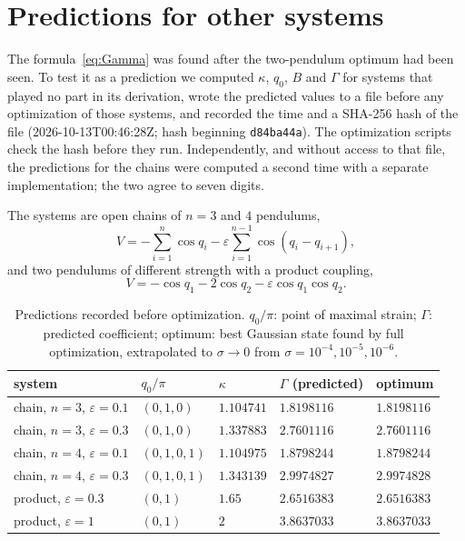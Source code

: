 \section{Predictions for other systems}
\label{sec:prediction}

The formula~\eqref{eq:Gamma} was found after the two-pendulum optimum had been seen. To test it as a prediction we computed $\kappa$, $q_0$, $B$ and $\Gamma$ for systems that played no part in its derivation, wrote the predicted values to a file before any optimization of those systems, and recorded the time and a SHA-256 hash of the file (2026-10-13T00:46:28Z; hash beginning \texttt{d84ba44a}). The optimization scripts check the hash before they run. Independently, and without access to that file, the predictions for the chains were computed a second time with a separate implementation; the two agree to seven digits.

The systems are open chains of $n = 3$ and $4$ pendulums,
\begin{equation}
V = -\sum_{i=1}^n \cos q_i - \varepsilon\sum_{i=1}^{n-1}\cos(q_i - q_{i+1}),
\label{eq:chain}
\end{equation}
and two pendulums of different strength with a product coupling,
\begin{equation}
V = -\cos q_1 - 2\cos q_2 - \varepsilon\cos q_1\cos q_2 .
\label{eq:product}
\end{equation}

\begin{table}[t]
\caption{Predictions recorded before optimization. $q_0/\pi$: point of maximal strain; $\Gamma$: predicted coefficient; optimum: best Gaussian state found by full optimization, extrapolated to $\sigma \to 0$ from $\sigma = 10^{-4}, 10^{-5}, 10^{-6}$.}
\label{tab:prediction}
\begin{ruledtabular}
\begin{tabular}{lllll}
system & $q_0/\pi$ & $\kappa$ & $\Gamma$ (predicted) & optimum \\
\hline
chain, $n=3$, $\varepsilon=0.1$ & $(0,1,0)$ & $1.104741$ & $1.8198116$ & $1.8198116$ \\
chain, $n=3$, $\varepsilon=0.3$ & $(0,1,0)$ & $1.337883$ & $2.7601116$ & $2.7601116$ \\
chain, $n=4$, $\varepsilon=0.1$ & $(0,1,0,1)$ & $1.104975$ & $1.8798244$ & $1.8798244$ \\
chain, $n=4$, $\varepsilon=0.3$ & $(0,1,0,1)$ & $1.343139$ & $2.9974827$ & $2.9974828$ \\
product, $\varepsilon=0.3$ & $(0,1)$ & $1.65$ & $2.6516383$ & $2.6516383$ \\
product, $\varepsilon=1$ & $(0,1)$ & $2$ & $3.8637033$ & $3.8637033$ \\
\end{tabular}
\end{ruledtabular}
\end{table}

